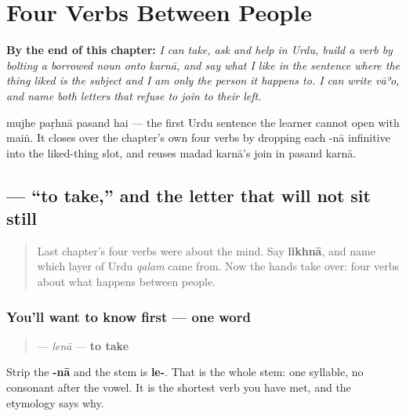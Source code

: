 
\chapter{Four Verbs Between People}
\label{ch:ur-social-verbs}

\begin{chapteropening}
\textbf{By the end of this chapter:} \emph{I can take, ask and help in Urdu, build a verb by bolting a borrowed noun onto karnā, and say what I like in the sentence where the thing liked is the subject and I am only the person it happens to. I can write vāʾo, and name both letters that refuse to join to their left.}

mujhe paṛhnā pasand hai — the first Urdu sentence the learner cannot open with maiṅ. It closes over the chapter's own four verbs by dropping each -nā infinitive into the liked-thing slot, and reuses madad karnā's join in pasand karnā.
\end{chapteropening}

\section[\texorpdfstring{\ur{لینا} (lenā)}{لینا (lenā)}]{ — “to take,” and the letter that will not sit still}

\label{lesson:UR-C08-lena}



\begin{quote}
Last chapter's four verbs were about the mind. Say \textbf{likhnā}, and name which layer of Urdu \emph{qalam} came from. Now the hands take over: four verbs about what happens between people.
\end{quote}

\subsection*{You'll want to know first — one word}
\begin{quote}
\textbf{} — \emph{lenā} — \textbf{to take}
\end{quote}

Strip the \textbf{-nā} and the stem is \textbf{le-}. That is the whole stem: one syllable, no consonant after the vowel. It is the shortest verb you have met, and the etymology says why.

